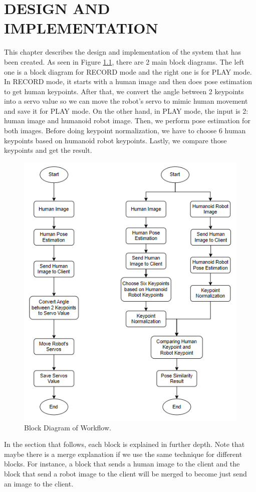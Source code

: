 \chapter{DESIGN AND IMPLEMENTATION}
\label{chap:desainandimplementation}


This chapter describes the design and implementation of the system that has been created.
As seen in Figure \ref{fig:block-diagram}, there are 2 main block diagrams. The left one is a block diagram for RECORD mode and the right one is for PLAY mode.
In RECORD mode, it starts with a human image and then does pose estimation to get human keypoints. After that, we convert the angle between 2 keypoints into a servo value so we can move the robot's servo to mimic human movement and save it for PLAY mode.
On the other hand, in PLAY mode, the input is 2: human image and humanoid robot image. Then, we perform pose estimation for both images. Before doing keypoint normalization, we have to choose 6 human keypoints based on humanoid robot keypoints. Lastly, we compare those keypoints and get the result.
\begin{figure}[ht]
  \centering
  \includegraphics[scale=1.23]{gambar/diagram-block-revisi.png}
  \caption{Block Diagram of Workflow.}
  \label{fig:block-diagram}
\end{figure}
In the section that follows, each block is explained in further depth. Note that maybe there is a merge explanation if we use the same technique for different blocks. For instance, a block that sends a human image to the client and the block that send a robot image to the client will be merged to become just send an image to the client.


